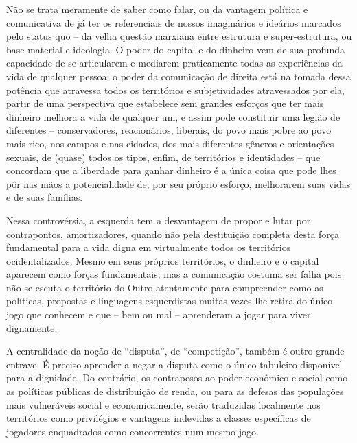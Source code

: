 Não se trata meramente de saber como falar, ou da vantagem política e comunicativa de já ter os referenciais de nossos imaginários e ideários marcados pelo status quo -- da velha questão marxiana entre estrutura e super-estrutura, ou base material e ideologia. O poder do capital e do dinheiro vem de sua profunda capacidade de se articularem e mediarem praticamente todas as experiências da vida de qualquer pessoa; o poder da comunicação de direita está na tomada dessa potência que atravessa todos os territórios e subjetividades atravessados por ela, partir de uma perspectiva que estabelece sem grandes esforços que ter mais dinheiro melhora a vida de qualquer um, e assim pode constituir uma legião de diferentes -- conservadores, reacionários, liberais, do povo mais pobre ao povo mais rico, nos campos e nas cidades, dos mais diferentes gêneros e orientações sexuais, de (quase) todos os tipos, enfim, de territórios e identidades -- que concordam que a liberdade para ganhar dinheiro é a única coisa que pode lhes pôr nas mãos a potencialidade de, por seu próprio esforço, melhorarem suas vidas e de suas famílias.

Nessa controvérsia, a esquerda tem a desvantagem de propor e lutar por contrapontos, amortizadores, quando não pela destituição completa desta força fundamental para a vida digna em virtualmente todos os territórios ocidentalizados. Mesmo em seus próprios territórios, o dinheiro e o capital aparecem como forças fundamentais; mas a comunicação costuma ser falha pois não se escuta o território do Outro atentamente para compreender como as políticas, propostas e linguagens esquerdistas muitas vezes lhe retira do único jogo que conhecem e que -- bem ou mal -- aprenderam a jogar para viver dignamente.

A centralidade da noção de \enquote{disputa}, de \enquote{competição}, também é outro grande entrave. É preciso aprender a negar a disputa como o único tabuleiro disponível para a dignidade. Do contrário, os contrapesos ao poder econômico e social como as políticas públicas de distribuição de renda, ou para as defesas das populações mais vulneráveis social e economicamente, serão traduzidas localmente nos territórios como privilégios e vantagens indevidas a classes específicas de jogadores enquadrados como concorrentes num mesmo jogo.


%

